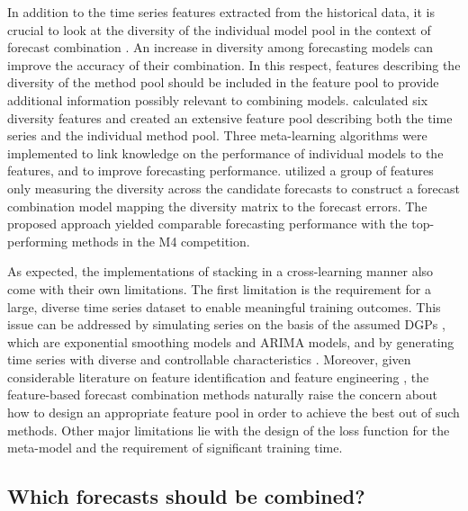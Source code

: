 \documentclass[11pt]{article}
\begin{document}
In addition to the time series features extracted from the historical data, it is crucial to look at the diversity of the individual model pool in the context of forecast combination \citep{Batchelor1995-ps,Thomson2019-al,Atiya2020-ge,Lichtendahl2020-ut}. An increase in diversity among forecasting models can improve the accuracy of their combination. In this respect, features describing the diversity of the method pool should be included in the feature pool to provide additional information possibly relevant to combining models. \cite{Lemke2010-wn} calculated six diversity features and created an extensive feature pool describing both the time series and the individual method pool. Three meta-learning algorithms were implemented to link knowledge on the performance of individual models to the features, and to improve forecasting performance. \cite{Kang2020-sv} utilized a group of features only measuring the diversity across the candidate forecasts to construct a forecast combination model mapping the diversity matrix to the forecast errors. The proposed approach yielded comparable forecasting performance with the top-performing methods in the M4 competition.

As expected, the implementations of stacking in a cross-learning manner also come with their own limitations. The first limitation is the requirement for a large, diverse time series dataset to enable meaningful training outcomes. This issue can be addressed by simulating series on the basis of the assumed DGPs \citep{talagala2018meta}, which are exponential smoothing models and ARIMA models, and by generating time series with diverse and controllable characteristics \citep{Kang2020-rl}. Moreover, given considerable literature on feature identification and feature engineering \citep[e.g.,][]{Wang2009-hs,Kang2017-wt,Lemke2010-wn,Montero-Manso2020-tq,Li2020-od}, the feature-based forecast combination methods naturally raise the concern about how to design an appropriate feature pool in order to achieve the best out of such methods. Other major limitations lie with the design of the loss function for the meta-model and the requirement of significant training time.

\subsection{Which forecasts should be combined?}
\label{sec:which_forecasts_should_be_combined}
\end{document}
